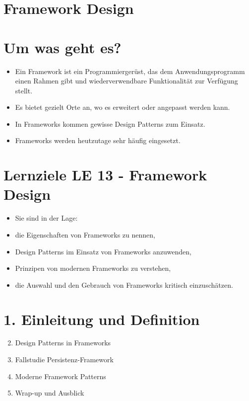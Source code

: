 \section{Framework Design}

\section*{Um was geht es?}
\begin{itemize}
  \item Ein Framework ist ein Programmiergerüst, das dem Anwendungsprogramm einen Rahmen gibt und wiederverwendbare Funktionalität zur Verfügung stellt.
  \item Es bietet gezielt Orte an, wo es erweitert oder angepasst werden kann.
  \item In Frameworks kommen gewisse Design Patterns zum Einsatz.
  \item Frameworks werden heutzutage sehr häufig eingesetzt.
\end{itemize}

\section*{Lernziele LE 13 - Framework Design}
\begin{itemize}
  \item Sie sind in der Lage:
  \item die Eigenschaften von Frameworks zu nennen,
  \item Design Patterns im Einsatz von Frameworks anzuwenden,
  \item Prinzipen von modernen Frameworks zu verstehen,
  \item die Auswahl und den Gebrauch von Frameworks kritisch einzuschätzen.
\end{itemize}

\section*{1. Einleitung und Definition}
\begin{enumerate}
  \setcounter{enumi}{1}
  \item Design Patterns in Frameworks
  \item Fallstudie Persistenz-Framework
  \item Moderne Framework Patterns
  \item Wrap-up und Ausblick
\end{enumerate}


